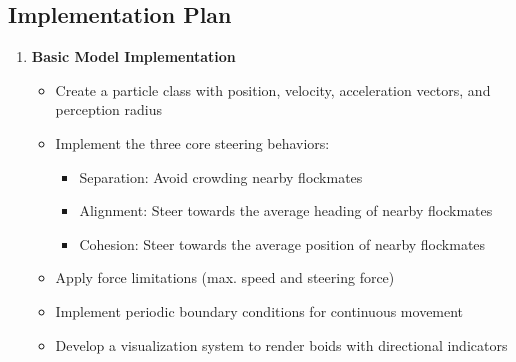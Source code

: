 \subsection{Implementation Plan}
\begin{enumerate}
	\item \textbf{Basic Model Implementation}
	      \begin{itemize}
		      \item Create a particle class with position, velocity, acceleration vectors, and perception radius
		      \item Implement the three core steering behaviors:
		            \begin{itemize}
			            \item Separation: Avoid crowding nearby flockmates
			            \item Alignment: Steer towards the average heading of nearby flockmates
			            \item Cohesion: Steer towards the average position of nearby flockmates
		            \end{itemize}
		      \item Apply force limitations (max. speed and steering force)
		      \item Implement periodic boundary conditions for continuous movement
		      \item Develop a visualization system to render boids with directional indicators
	      \end{itemize}


\end{enumerate}
